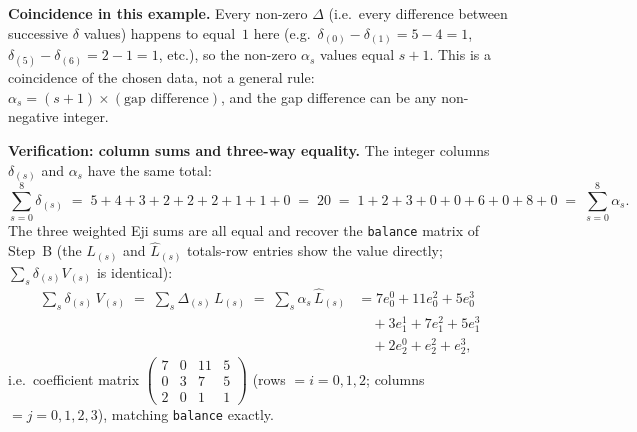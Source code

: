 \documentclass[11pt,a4paper]{article}
\newcommand{\eji}[2]{e^{#1}_{#2}}       %
\begin{document}

\begin{tcolorbox}[notebox]
\textbf{Coincidence in this example.}  Every non-zero $\Delta$ (i.e.~every difference
between successive $\delta$ values)
happens to equal~$1$ here (e.g.\ $\delta_{(0)}-\delta_{(1)}=5-4=1$,
$\delta_{(5)}-\delta_{(6)}=2-1=1$, etc.), so the non-zero $\alpha_s$ values
equal $s{+}1$.  This is a coincidence of the chosen data, not a general rule:
$\alpha_s = (s{+}1)\times(\text{gap difference})$, and the gap difference can
be any non-negative integer.
\end{tcolorbox}

\begin{tcolorbox}[notebox]
\textbf{Verification: column sums and three-way equality.}
The integer columns $\delta_{(s)}$ and $\alpha_s$ have the same total:
\[
  \sum_{s=0}^{8}\delta_{(s)} \;=\; 5+4+3+2+2+2+1+1+0 \;=\; 20
  \;=\; 1+2+3+0+0+6+0+8+0 \;=\; \sum_{s=0}^{8}\alpha_s.
\]
The three weighted Eji sums are all equal and recover the
\texttt{balance} matrix of Step~B (the $L_{(s)}$ and ${\hat L}_{(s)}$ totals-row
entries show the value directly; $\sum_s\delta_{(s)}V_{(s)}$ is identical):
\begin{align*}
  \sum_s \delta_{(s)}\,V_{(s)}
  \;=\; \sum_s \Delta_{(s)}\,L_{(s)}
  \;=\; \sum_s \alpha_s\,{\hat L}_{(s)}
  &= 7\eji{0}{0}+11\eji{2}{0}+5\eji{3}{0} \\
  &\quad{}+3\eji{1}{1}+7\eji{2}{1}+5\eji{3}{1} \\
  &\quad{}+2\eji{0}{2}+\eji{2}{2}+\eji{3}{2},
\end{align*}
i.e.\ coefficient matrix
$\left(\begin{smallmatrix}7&0&11&5\\0&3&7&5\\2&0&1&1\end{smallmatrix}\right)$
(rows $=i=0,1,2$; columns $=j=0,1,2,3$), matching \texttt{balance} exactly.
\end{tcolorbox}
\end{document}
